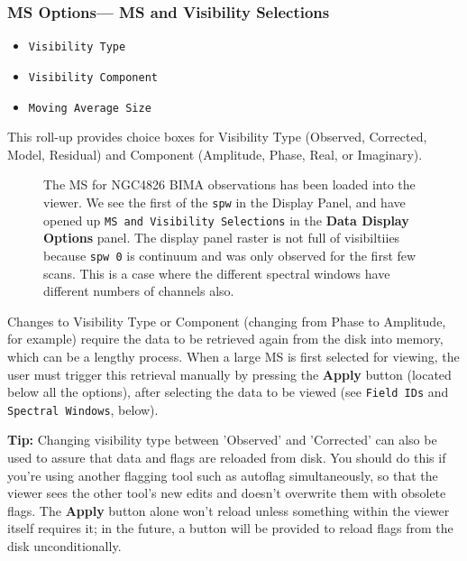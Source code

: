 \subsubsection{MS Options--- MS and Visibility Selections}
\label{section:display.ms.adjust.select}

\begin{itemize}

\item {\tt Visibility Type}

\item {\tt Visibility Component}

\item {\tt Moving Average Size}

\end{itemize}

This roll-up provides choice boxes for Visibility Type
(Observed, Corrected, Model, Residual) and Component (Amplitude,
Phase, Real, or Imaginary).  

\begin{figure}[h!]
\begin{center}
\caption{\label{fig:viewer_axes_1} The MS for NGC4826 BIMA
observations has been loaded into the viewer.  We see the
first of the {\tt spw} in the Display Panel, and have opened
up {\tt MS and Visibility Selections} in the
{\bf Data Display Options} panel.  The display panel raster is
not full of visibiltiies because {\tt spw 0} is continuum and
was only observed for the first few scans.  This is a case where
the different spectral windows have different numbers of channels
also.}
\hrulefill
\end{center}
\end{figure}

Changes to Visibility Type or Component (changing from Phase to
Amplitude, for example) require the data to be retrieved again
from the disk into memory, which can be a lengthy process.  When a
large MS is first selected for viewing, the user must
trigger this retrieval manually by pressing the {\bf Apply} button
(located below all the options), after selecting the data to be
viewed (see {\tt Field IDs} and {\tt Spectral Windows}, below).

{\bf Tip:} Changing visibility type between 'Observed' and 'Corrected' can
also be used to assure that data and flags are reloaded from disk.  You
should do this if you're using another flagging tool such as autoflag
simultaneously, so that the viewer sees the other tool's new edits
and doesn't overwrite them with obsolete flags.  The {\bf Apply} button 
alone won't reload unless something within the viewer itself requires
it; in the future, a button will be provided to reload flags from the disk
unconditionally.  

